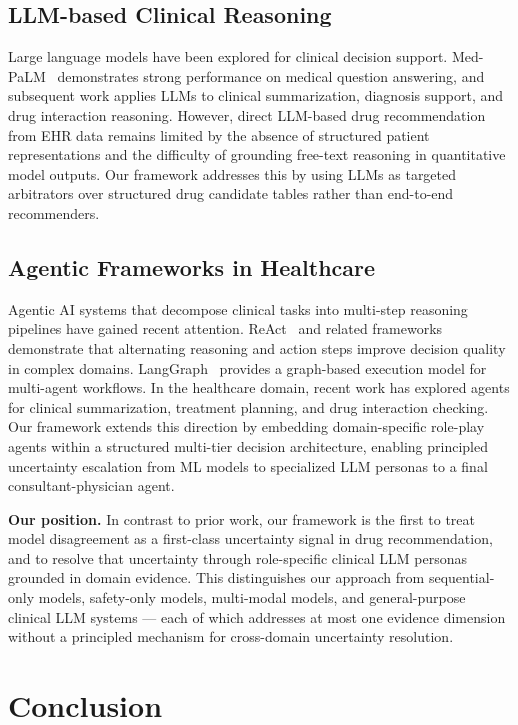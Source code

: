 \documentclass[sigconf,anonymous]{acmart}
\begin{document}
\subsection{LLM-based Clinical Reasoning}
Large language models have been explored for clinical decision support. Med-PaLM~\cite{medpalm} demonstrates strong performance on medical question answering, and subsequent work applies LLMs to clinical summarization, diagnosis support, and drug interaction reasoning. However, direct LLM-based drug recommendation from EHR data remains limited by the absence of structured patient representations and the difficulty of grounding free-text reasoning in quantitative model outputs. Our framework addresses this by using LLMs as targeted arbitrators over structured drug candidate tables rather than end-to-end recommenders.

\subsection{Agentic Frameworks in Healthcare}
Agentic AI systems that decompose clinical tasks into multi-step reasoning pipelines have gained recent attention. ReAct~\cite{react} and related frameworks demonstrate that alternating reasoning and action steps improve decision quality in complex domains. LangGraph~\cite{langgraph} provides a graph-based execution model for multi-agent workflows. In the healthcare domain, recent work has explored agents for clinical summarization, treatment planning, and drug interaction checking. Our framework extends this direction by embedding domain-specific role-play agents within a structured multi-tier decision architecture, enabling principled uncertainty escalation from ML models to specialized LLM personas to a final consultant-physician agent.

\noindent\textbf{Our position.}
In contrast to prior work, our framework is the first to treat model disagreement as a first-class uncertainty signal in drug recommendation, and to resolve that uncertainty through role-specific clinical LLM personas grounded in domain evidence. This distinguishes our approach from sequential-only models, safety-only models, multi-modal models, and general-purpose clinical LLM systems — each of which addresses at most one evidence dimension without a principled mechanism for cross-domain uncertainty resolution.

\section{Conclusion}
\end{document}
